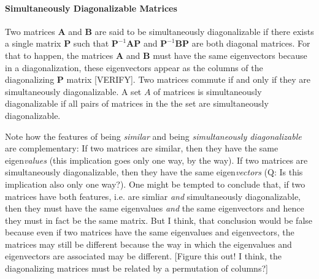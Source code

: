 




\paragraph{Simultaneously Diagonalizable Matrices}
Two matrices $\mathbf{A}$ and $\mathbf{B}$ are said to be simultaneously diagonalizable if there exists a single matrix $\mathbf{P}$ such that $\mathbf{P}^{-1} \mathbf{A} \mathbf{P}$ and  $\mathbf{P}^{-1} \mathbf{B} \mathbf{P}$ are both diagonal matrices. For that to happen, the matrices $\mathbf{A}$ and $\mathbf{B}$ must have the same eigenvectors because in a diagonalization, these eigenvectors appear as the columns of the diagonalizing $\mathbf{P}$ matrix [VERIFY]. Two matrices commute if and only if they are simultaneously diagonalizable. A set $A$ of matrices is simultaneously diagonalizable if all pairs of matrices in the the set are simultaneously diagonalizable.  


\medskip
Note how the features of being \emph{similar} and being \emph{simultaneously diagonalizable} are complementary: If two matrices are similar, then they have the same eigen\emph{values} (this implication goes only one way, by the way). If two matrices are simultaneously diagonalizable, then they have the same eigen\emph{vectors} (Q: Is this implication also only one way?). One might be tempted to conclude that, if two matrices have both features, i.e. are simliar \emph{and} simultaneously diagonalizable, then they must have the same eigenvalues \emph{and} the same eigenvectors and hence they must in fact be the same matrix. But I think, that conclusion would be false because even if two matrices have the same eigenvalues and eigenvectors, the matrices may still be different because the way in which the eigenvalues and eigenvectors are associated may be different. [Figure this out! I think, the diagonalizing matrices must be related by a permutation of columns?]

